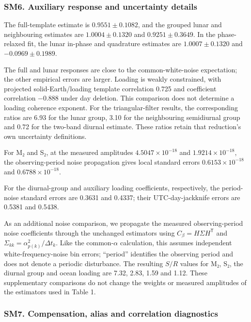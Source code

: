 \documentclass[
  11pt,
  a4paper,
]{article}
\begin{document}
\hypertarget{sm6.-auxiliary-response-and-uncertainty-details}{%
\subsubsection{SM6. Auxiliary response and uncertainty
details}\label{sm6.-auxiliary-response-and-uncertainty-details}}

The full-template estimate is \(0.9551\pm0.1082\), and the grouped lunar
and neighbouring estimates are \(1.0004\pm0.1320\) and
\(0.9251\pm0.3649\). In the phase-relaxed fit, the lunar in-phase and
quadrature estimates are \(1.0007\pm0.1320\) and \(-0.0969\pm0.1989\).

The full and lunar responses are close to the common-white-noise
expectation; the other empirical errors are larger. Loading is weakly
constrained, with projected solid-Earth/loading template correlation
0.725 and coefficient correlation −0.888 under day deletion. This
comparison does not determine a loading coherence exponent. For the
triangular-filter results, the corresponding ratios are 6.93 for the
lunar group, 3.10 for the neighbouring semidiurnal group and 0.72 for
the two-band diurnal estimate. These ratios retain that reduction's own
uncertainty definitions.

For M₂ and S₂, at the measured amplitudes \(4.5047\times10^{-18}\) and
\(1.9214\times10^{-18}\), the observing-period noise propagation gives
local standard errors \(0.6153\times10^{-18}\) and
\(0.6788\times10^{-18}\).

For the diurnal-group and auxiliary loading coefficients, respectively,
the period-noise standard errors are 0.3631 and 0.4337; their
UTC-day-jackknife errors are 0.5381 and 0.5438.

As an additional noise comparison, we propagate the measured
observing-period noise coefficients through the unchanged estimators
using \(C_\beta=H\Sigma H^{\mathsf T}\) and
\(\Sigma_{kk}=\alpha_{p(k)}^2/\Delta t_k\). Like the common-\(\alpha\)
calculation, this assumes independent white-frequency-noise bin errors;
``period'' identifies the observing period and does not denote a
periodic disturbance. The resulting \(S/R\) values for M₂, S₂, the
diurnal group and ocean loading are 7.32, 2.83, 1.59 and 1.12. These
supplementary comparisons do not change the weights or measured
amplitudes of the estimators used in Table 1.

\hypertarget{sm7.-compensation-alias-and-correlation-diagnostics}{%
\subsubsection{SM7. Compensation, alias and correlation
diagnostics}\label{sm7.-compensation-alias-and-correlation-diagnostics}}
\end{document}
